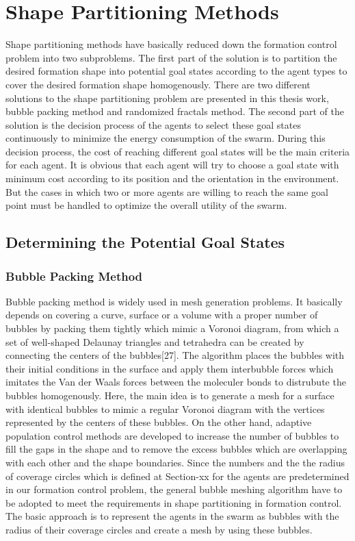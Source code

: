 \documentclass[twoside]{article}
\begin{document}
			
			
		\section{Shape Partitioning Methods}
			
			Shape partitioning methods have basically reduced down the formation control problem into two subproblems. The first part of the solution is to partition the desired formation shape into potential goal states according to the agent types to cover the desired formation shape homogenously. There are two different solutions to the shape partitioning problem are presented in this thesis work, bubble packing method and randomized fractals method. The second part of the solution is the decision process of the agents to select these goal states continuously to minimize the energy consumption of the swarm. During this decision process, the cost of reaching different goal states will be the main criteria for each agent. It is obvious that each agent will try to choose a goal state with minimum cost according to its position and the orientation in the environment. But the cases in which two or more agents are willing to reach the same goal point must be handled to optimize the overall utility of the swarm.
			
			\subsection{Determining the Potential Goal States}
			\subsubsection{Bubble Packing Method}
			
			Bubble packing method is widely used in mesh generation problems. It basically depends on covering a curve, surface or a volume with a proper number of bubbles by packing them tightly which mimic a Voronoi diagram, from which a set of well-shaped Delaunay triangles and tetrahedra can be created by connecting the centers of the bubbles[27].  The algorithm places the bubbles with their initial conditions in the surface and apply them interbubble forces which imitates the Van der Waals forces between the moleculer bonds  to distrubute the bubbles homogenously. Here, the main idea is to generate a mesh for a surface with identical bubbles to mimic a regular Voronoi diagram with the vertices represented by the centers of these bubbles. On the other hand, adaptive population control  methods are developed to increase the number of bubbles to fill the gaps in the shape and to remove the excess bubbles which are overlapping with each other and the shape boundaries. 
			 Since the numbers and the the radius of coverage circles which is defined at Section-xx for the agents are predetermined in our formation control problem, the general bubble meshing algorithm have to be adopted to meet the requirements in shape partitioning in formation control.  The basic approach is to represent the agents in the swarm as bubbles with the radius of  their coverage circles and create a mesh by using these bubbles. 
			
\end{document}
